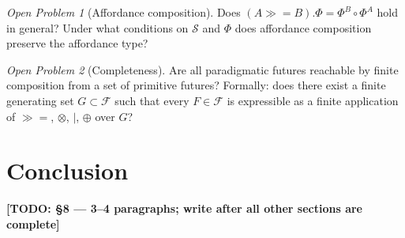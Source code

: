 \documentclass[11pt, a4paper]{article}
\theoremstyle{plain}
\theoremstyle{definition}
\theoremstyle{remark}
\newtheorem{openproblem}{Open Problem}
\newcommand{\bind}{\mathbin{\gg\!=}}          %
\newcommand{\tensor}{\otimes}                  %
\newcommand{\pfork}{\mathbin{|}}               %
\newcommand{\merge}{\oplus}                    %
\newcommand{\Fut}{\mathcal{F}}                 %
\newcommand{\States}{\mathcal{S}}              %
\newcommand{\aff}{\Phi}                        %
\begin{document}
\begin{openproblem}[Affordance composition]
\label{op:4}
Does $(A \bind B).\aff = \aff^B \circ \aff^A$ hold in general?
Under what conditions on $\States$ and $\aff$ does affordance composition
preserve the affordance type?
\end{openproblem}

\begin{openproblem}[Completeness]
\label{op:5}
Are all paradigmatic futures reachable by finite composition from a set of
primitive futures?
Formally: does there exist a finite generating set
$G \subset \Fut$ such that every $F \in \Fut$ is expressible as a finite
application of $\bind$, $\tensor$, $\pfork$, $\merge$ over $G$?
\end{openproblem}

\section{Conclusion}
\label{sec:conclusion}


\textbf{[TODO: \S8 — 3--4 paragraphs; write after all other sections
are complete]}

\printbibliography
\end{document}
